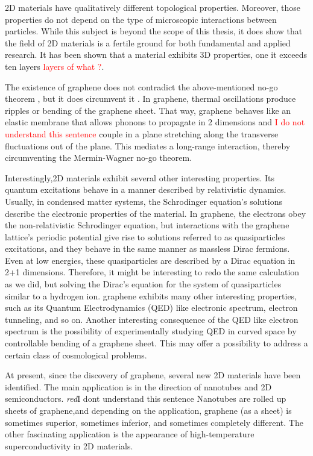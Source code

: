 2D materials have qualitatively different topological properties\cite{2DMatterCurvature}. Moreover, those properties do not depend on the type of microscopic interactions between particles. While this subject is beyond the scope of this thesis, it does show that the field of 2D materials is a fertile ground for both fundamental and applied research. It has been shown \cite{GraphLayers} that a material exhibits 3D properties, one it exceeds ten layers \textcolor{red}{layers of what ?}.

The existence of graphene does not contradict the above-mentioned no-go theorem \cite{Mermin2}, but it does circumvent it \cite{GrapheneRiples}. In graphene, thermal oscillations produce ripples or bending of the graphene sheet. That way, graphene behaves like an elastic membrane that allows phonons to propagate in 2 dimensions and \textcolor{red}{I do not understand this sentence} couple in a plane stretching along the transverse fluctuations out of the plane. This mediates a long-range interaction, thereby circumventing the Mermin-Wagner no-go theorem. 

Interestingly\cite{Graphene0},2D materials exhibit several other interesting properties. Its quantum excitations behave in a manner described by relativistic dynamics. Usually, in condensed matter systems, the Schrodinger equation's solutions describe the electronic properties of the material. In graphene, the electrons obey the non-relativistic Schrodinger equation, but interactions with the graphene lattice's periodic potential give rise to solutions referred to as
quasiparticles excitations, and they behave in the same manner as massless Dirac fermions. Even at low energies, these quasiparticles are described by a Dirac equation in 2+1 dimensions. Therefore, it might be interesting to redo the same calculation as we did, but solving the Dirac's equation for the system of quasiparticles similar to a hydrogen ion. 
graphene exhibits many other interesting properties\cite{Graphene0}, such as its Quantum Electrodynamics (QED) like electronic spectrum, electron tunneling, and so on. Another interesting consequence of the QED like electron spectrum is the possibility of experimentally studying QED in curved space by controllable bending of a graphene sheet. This may offer a possibility to address a certain class of cosmological problems. 

At present, since the discovery of graphene,
several new 2D materials have
been identified\cite{Many2DMaterials}. The main application is in the direction of nanotubes and 2D semiconductors. 
\textit{red}{I dont understand this sentence}
Nanotubes are rolled up sheets of graphene,and depending on the application, graphene (as a sheet) is sometimes superior, sometimes inferior, and sometimes completely different. The other fascinating application is the appearance of high-temperature superconductivity in 2D materials\cite{2DSuper}.


